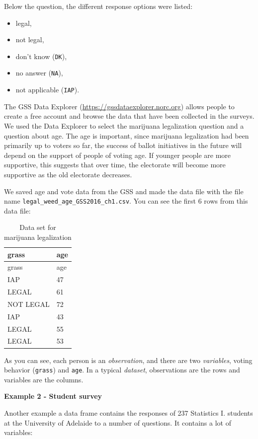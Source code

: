 \documentclass[
]{book}
\providecommand{\tightlist}{%
  \setlength{\itemsep}{0pt}\setlength{\parskip}{0pt}}
\begin{document}
Below the question, the different response options were listed:

\begin{itemize}
\tightlist
\item
  legal,
\item
  not legal,
\item
  don't know (\texttt{DK}),
\item
  no answer (\texttt{NA}),
\item
  not applicable (\texttt{IAP}).
\end{itemize}

The GSS Data Explorer (\url{https://gssdataexplorer.norc.org}) allows
people to create a free account and browse the data that have been
collected in the surveys. We used the Data Explorer to select the
marijuana legalization question and a question about age. The age is
important, since marijuana legalization had been primarily up to voters
so far, the success of ballot initiatives in the future will depend on
the support of people of voting age. If younger people are more
supportive, this suggests that over time, the electorate will become
more supportive as the old electorate decreases.

We saved age and vote data from the GSS and made the data file with the
file name \texttt{legal\_weed\_age\_GSS2016\_ch1.csv}. You can see the first 6 rows
from this data file:

\begin{longtable}[]{@{}ll@{}}
\caption{\label{tab:unnamed-chunk-2}Data set for marijuana legalization}\tabularnewline
\toprule
grass & age\tabularnewline
\midrule
\endfirsthead
\toprule
grass & age\tabularnewline
\midrule
\endhead
IAP & 47\tabularnewline
LEGAL & 61\tabularnewline
NOT LEGAL & 72\tabularnewline
IAP & 43\tabularnewline
LEGAL & 55\tabularnewline
LEGAL & 53\tabularnewline
\bottomrule
\end{longtable}

As you can see, each person is an \emph{observation}, and there are two \emph{variables}, voting behavior (\texttt{grass}) and \texttt{age}. In a typical \emph{dataset}, observations are the rows and variables are the columns.

\textbf{Example 2 - Student survey}

Another example a data frame contains the responses of 237 Statistics I. students at the University of Adelaide to a number of questions. It contains a lot of variables:
\end{document}
